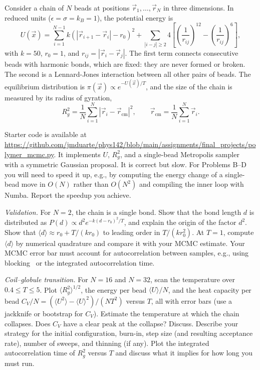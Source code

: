 Consider a chain of $N$ beads at positions $\vec r_1, \dots, \vec r_N$ in three dimensions.
In reduced units ($\epsilon = \sigma = k_B = 1$), the potential energy is
\begin{equation}
  U(\vec x) = \sum_{i=1}^{N-1} k\left(|\vec r_{i+1}-\vec r_i| - r_0\right)^2 + \sum_{|i-j|\geq 2} 4\left[\left(\frac{1}{r_{ij}}\right)^{12} - \left(\frac{1}{r_{ij}}\right)^{6}\right],
\end{equation}
with $k = 50$, $r_0 = 1$, and $r_{ij} = |\vec r_i - \vec r_j|$.
The first term connects consecutive beads with harmonic bonds, which are fixed: they are never formed or broken.
The second is a Lennard-Jones interaction between all other pairs of beads.
The equilibrium distribution is $\pi(\vec x) \propto e^{-U(\vec x)/T}$, and the size of the chain is measured by its radius of gyration,
\begin{equation}
  R_g^2 = \frac{1}{N}\sum_{i=1}^{N}|\vec r_i - \vec r_\text{cm}|^2, \qquad \vec r_\text{cm} = \frac{1}{N}\sum_{i=1}^N \vec r_i.
\end{equation}

Starter code is available at \url{https://github.com/jmduarte/phys142/blob/main/assignments/final_projects/polymer_mcmc.py}.
It implements $U$, $R_g^2$, and a single-bead Metropolis sampler~\cite{Metropolis:1953} with a symmetric Gaussian proposal.
It is correct but slow.
For Problems B--D you will need to speed it up, e.g., by computing the energy change of a single-bead move in $O(N)$ rather than $O(N^2)$ and compiling the inner loop with Numba.
Report the speedup you achieve.

\begin{problem}
  \emph{Validation.}
  For $N=2$, the chain is a single bond.
  Show that the bond length $d$ is distributed as $P(d) \propto d^2 e^{-k(d-r_0)^2/T}$, and explain the origin of the factor $d^2$.
  Show that $\langle d\rangle \approx r_0 + T/(k r_0)$ to leading order in $T/(k r_0^2)$.
  At $T=1$, compute $\langle d \rangle$ by numerical quadrature and compare it with your MCMC estimate.
  Your MCMC error bar must account for autocorrelation between samples, e.g., using blocking~\cite{Flyvbjerg:1989} or the integrated autocorrelation time.
\end{problem}

\begin{problem}
  \emph{Coil--globule transition.}
  For $N=16$ and $N=32$, scan the temperature over $0.4 \leq T \leq 5$.
  Plot $\langle R_g^2\rangle^{1/2}$, the energy per bead $\langle U\rangle/N$, and the heat capacity per bead $C_V/N = (\langle U^2\rangle - \langle U\rangle^2)/(N T^2)$ versus $T$, all with error bars (use a jackknife or bootstrap for $C_V$).
  Estimate the temperature at which the chain collapses.
  Does $C_V$ have a clear peak at the collapse? Discuss.
  Describe your strategy for the initial configuration, burn-in, step size (and resulting acceptance rate), number of sweeps, and thinning (if any).
  Plot the integrated autocorrelation time of $R_g^2$ versus $T$ and discuss what it implies for how long you must run.
\end{problem}

